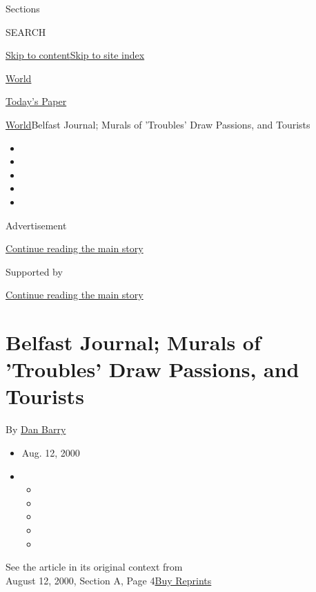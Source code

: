 Sections

SEARCH

\protect\hyperlink{site-content}{Skip to
content}\protect\hyperlink{site-index}{Skip to site index}

\href{https://www.nytimes.com/section/world}{World}

\href{https://myaccount.nytimes.com/auth/login?response_type=cookie\&client_id=vi}{}

\href{https://www.nytimes.com/section/todayspaper}{Today's Paper}

\href{/section/world}{World}\textbar{}Belfast Journal; Murals of
'Troubles' Draw Passions, and Tourists

\begin{itemize}
\item
\item
\item
\item
\item
\end{itemize}

Advertisement

\protect\hyperlink{after-top}{Continue reading the main story}

Supported by

\protect\hyperlink{after-sponsor}{Continue reading the main story}

\hypertarget{belfast-journal-murals-of-troubles-draw-passions-and-tourists}{%
\section{Belfast Journal; Murals of 'Troubles' Draw Passions, and
Tourists}\label{belfast-journal-murals-of-troubles-draw-passions-and-tourists}}

By \href{https://www.nytimes.com/by/dan-barry}{Dan Barry}

\begin{itemize}
\item
  Aug. 12, 2000
\item
  \begin{itemize}
  \item
  \item
  \item
  \item
  \item
  \end{itemize}
\end{itemize}

See the article in its original context from\\
August 12, 2000, Section A, Page
4\href{https://store.nytimes.com/collections/new-york-times-page-reprints?utm_source=nytimes\&utm_medium=article-page\&utm_campaign=reprints}{Buy
Reprints}

